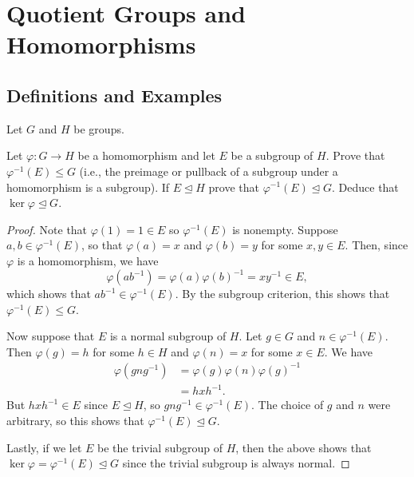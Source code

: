 \chapter{Quotient Groups and Homomorphisms}

\section{Definitions and Examples}

Let $G$ and $H$ be groups.

\label{exercise:quotient-group:preimage-of-hom-is-subgroup}
Let $\varphi\colon G\to H$ be a homomorphism and let $E$ be a subgroup
of $H$. Prove that $\varphi^{-1}(E)\leq G$ (i.e., the preimage or
pullback of a subgroup under a homomorphism is a subgroup). If
$E\trianglelefteq H$ prove that $\varphi^{-1}(E)\trianglelefteq
G$. Deduce that $\ker\varphi\trianglelefteq G$.
\begin{proof}
  Note that $\varphi(1) = 1\in E$ so $\varphi^{-1}(E)$ is
  nonempty. Suppose $a, b \in \varphi^{-1}(E)$, so that
  $\varphi(a) = x$ and $\varphi(b) = y$ for some $x,y\in E$. Then,
  since $\varphi$ is a homomorphism, we have
  \begin{equation*}
    \varphi(ab^{-1}) = \varphi(a)\varphi(b)^{-1} = xy^{-1} \in E,
  \end{equation*}
  which shows that $ab^{-1}\in\varphi^{-1}(E)$. By the subgroup
  criterion, this shows that $\varphi^{-1}(E)\leq G$.

  Now suppose that $E$ is a normal subgroup of $H$. Let $g\in G$ and
  $n\in\varphi^{-1}(E)$. Then $\varphi(g) = h$ for some $h\in H$ and
  $\varphi(n) = x$ for some $x\in E$. We have
  \begin{align*}
    \varphi(gng^{-1})
    &= \varphi(g)\varphi(n)\varphi(g)^{-1} \\
    &= hxh^{-1}.
  \end{align*}
  But $hxh^{-1}\in E$ since $E\trianglelefteq H$, so
  $gng^{-1}\in\varphi^{-1}(E)$. The choice of $g$ and $n$ were
  arbitrary, so this shows that $\varphi^{-1}(E)\trianglelefteq G$.

  Lastly, if we let $E$ be the trivial subgroup of $H$, then the above
  shows that $\ker\varphi = \varphi^{-1}(E) \trianglelefteq G$ since
  the trivial subgroup is always normal.
\end{proof}

